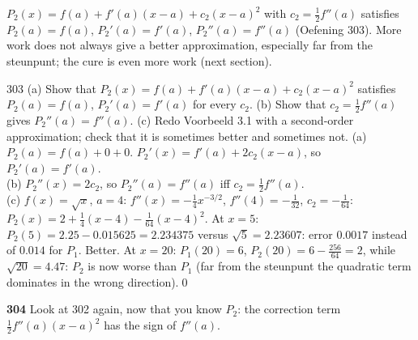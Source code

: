 \begin{key}
$P_2(x)=f(a)+f'(a)(x-a)+c_2(x-a)^2$ with $c_2=\frac12f''(a)$ satisfies $P_2(a)=f(a)$, $P_2'(a)=f'(a)$, $P_2''(a)=f''(a)$ (Oefening 303). More work does not always give a better approximation, especially far from the steunpunt; the cure is even more work (next section).
\end{key}

\begin{bookex}{303}
(a) Show that $P_2(x)=f(a)+f'(a)(x-a)+c_2(x-a)^2$ satisfies $P_2(a)=f(a)$, $P_2'(a)=f'(a)$ for every $c_2$. (b) Show that $c_2=\frac12f''(a)$ gives $P_2''(a)=f''(a)$. (c) Redo Voorbeeld 3.1 with a second-order approximation; check that it is sometimes better and sometimes not.
\solution
(a) $P_2(a)=f(a)+0+0$. $P_2'(x)=f'(a)+2c_2(x-a)$, so $P_2'(a)=f'(a)$.\\
(b) $P_2''(x)=2c_2$, so $P_2''(a)=f''(a)$ iff $c_2=\frac12f''(a)$.\\
(c) $f(x)=\sqrt x$, $a=4$: $f''(x)=-\frac14x^{-3/2}$, $f''(4)=-\frac1{32}$, $c_2=-\frac1{64}$: $P_2(x)=2+\frac14(x-4)-\frac1{64}(x-4)^2$. At $x=5$: $P_2(5)=2.25-0.015625=2.234375$ versus $\sqrt5=2.23607$: error $0.0017$ instead of $0.014$ for $P_1$. Better. At $x=20$: $P_1(20)=6$, $P_2(20)=6-\frac{256}{64}=2$, while $\sqrt{20}=4.47$: $P_2$ is now worse than $P_1$ (far from the steunpunt the quadratic term dominates in the wrong direction).\qed
\end{bookex}

\begin{trybox}[{304}]
\textbf{304} Look at 302 again, now that you know $P_2$: the correction term $\frac12f''(a)(x-a)^2$ has the sign of $f''(a)$.
\end{trybox}

